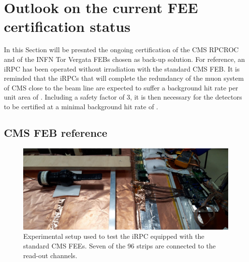 	\section{Outlook on the current FEE certification status}
	\label{chapt6:sec:outlooks}
	
	In this Section will be presnted the ongoing certification of the CMS RPCROC and of the INFN Tor Vergata FEBs chosen as back-up solution. For reference, an iRPC has been operated without irradiation with the standard CMS FEB. It is reminded that the iRPCs that will complete the redundancy of the muon system of CMS close to the beam line are expected to suffer a background hit rate per unit area of . Including a safety factor of 3, it is then necessary for the detectors to be certified at a minimal background hit rate of .
	
		\subsection{CMS \acl{FEB} reference}
		\label{chapt6:ssec:CMSFEBref}
		
	\begin{figure}[H]
		\centering
		\includegraphics[width = 0.9\linewidth]{fig/chapt6/iRPC-CMS_FEB-Setup.png}
		\caption{\label{fig:iRPC_CMS_Setup} Experimental setup used to test the iRPC equipped with the standard CMS FEEs. Seven of the 96 strips are connected to the read-out channels.}
    \end{figure}
    
